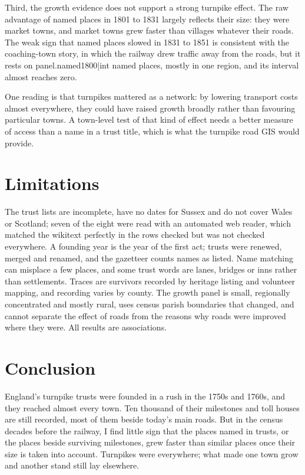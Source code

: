 \documentclass[11pt,a4paper]{article}
\begin{document}
Third, the growth evidence does not support a strong turnpike effect. The raw advantage of named places in 1801 to 1831 largely reflects their size: they were market towns, and market towns grew faster than villages whatever their roads. The weak sign that named places slowed in 1831 to 1851 is consistent with the coaching-town story, in which the railway drew traffic away from the roads, but it rests on {{panel.named1800|int}} named places, mostly in one region, and its interval almost reaches zero.

One reading is that turnpikes mattered as a network: by lowering transport costs almost everywhere, they could have raised growth broadly rather than favouring particular towns. A town-level test of that kind of effect needs a better measure of access than a name in a trust title, which is what the turnpike road GIS would provide.

\section{Limitations}

The trust lists are incomplete, have no dates for Sussex and do not cover Wales or Scotland; seven of the eight were read with an automated web reader, which matched the wikitext perfectly in the rows checked but was not checked everywhere. A founding year is the year of the first act; trusts were renewed, merged and renamed, and the gazetteer counts names as listed. Name matching can misplace a few places, and some trust words are lanes, bridges or inns rather than settlements. Traces are survivors recorded by heritage listing and volunteer mapping, and recording varies by county. The growth panel is small, regionally concentrated and mostly rural, uses census parish boundaries that changed, and cannot separate the effect of roads from the reasons why roads were improved where they were. All results are associations.

\section{Conclusion}

England's turnpike trusts were founded in a rush in the 1750s and 1760s, and they reached almost every town. Ten thousand of their milestones and toll houses are still recorded, most of them beside today's main roads. But in the census decades before the railway, I find little sign that the places named in trusts, or the places beside surviving milestones, grew faster than similar places once their size is taken into account. Turnpikes were everywhere; what made one town grow and another stand still lay elsewhere.
\end{document}
